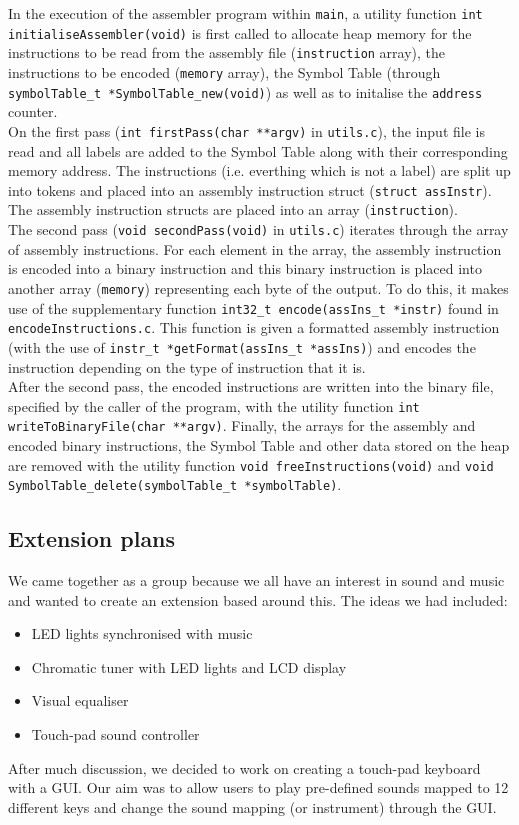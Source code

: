 \documentclass[11pt]{article}
\begin{document}
In the execution of the assembler program within \texttt{main}, a utility function \texttt{int initialiseAssembler(void)} is first called to allocate heap memory for the instructions to be read from the assembly file (\texttt{instruction} array), the instructions to be encoded (\texttt{memory} array), the Symbol Table (through \texttt{symbolTable\_t *SymbolTable\_new(void)}) as well as to initalise the \texttt{address} counter.\\

On the first pass (\texttt{int firstPass(char **argv)} in \texttt{utils.c}), the input file is read and all labels are added to the Symbol Table along with their corresponding memory address. The instructions (i.e. everthing which is not a label) are split up into tokens and placed into an assembly instruction struct (\texttt{struct assInstr}). The assembly instruction structs are placed into an array (\texttt{instruction}).\\

The second pass (\texttt{void secondPass(void)} in \texttt{utils.c}) iterates through the array of assembly instructions. For each element in the array, the assembly instruction is encoded into a binary instruction and this binary instruction is placed into another array (\texttt{memory}) representing each byte of the output. To do this, it makes use of the supplementary function \texttt{int32\_t encode(assIns\_t *instr)} found in \texttt{encodeInstructions.c}. This function is given a formatted assembly instruction (with the use of \texttt{instr\_t *getFormat(assIns\_t *assIns)}) and encodes the instruction depending on the type of instruction that it is.\\

After the second pass, the encoded instructions are written into the binary file, specified by the caller of the program, with the utility function \texttt{int writeToBinaryFile(char **argv)}. Finally, the arrays for the assembly and encoded binary instructions, the Symbol Table  and other data stored on the heap are removed with the utility function \texttt{void freeInstructions(void)} and \texttt{void SymbolTable\_delete(symbolTable\_t *symbolTable)}.

\subsection{Extension plans}

We came together as a group because we all have an interest in sound and music and wanted to create an extension based around this. The ideas we had included:
\begin{itemize}
\item LED lights synchronised with music
\item Chromatic tuner with LED lights and LCD display
\item Visual equaliser 
\item Touch-pad sound controller 
\end{itemize}
After much discussion, we decided to work on creating a touch-pad keyboard with a GUI. Our aim was to allow users to play pre-defined sounds mapped to 12 different keys and change the sound mapping (or instrument) through the GUI.
\end{document}
